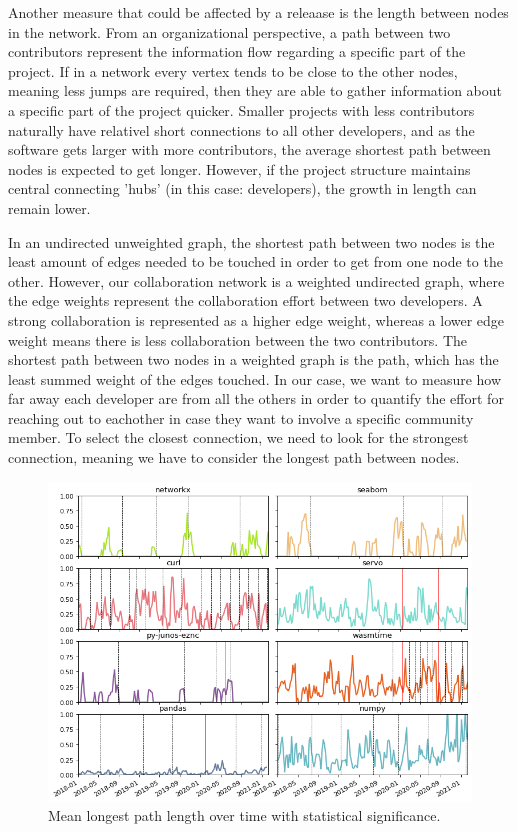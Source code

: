 Another measure that could be affected by a releaase is the length between nodes in the network. From an organizational perspective, a path between two contributors represent the information flow regarding a specific part of the project. If in a network every vertex tends to be close to the other nodes, meaning less jumps are required, then they are able to gather information about a specific part of the project quicker. Smaller projects with less contributors naturally have relativel short connections to all other developers, and as the software gets larger with more contributors, the average shortest path between nodes is expected to get longer. However, if the project structure maintains central connecting 'hubs' (in this case: developers), the growth in length can remain lower.

In an undirected unweighted graph, the shortest path between two nodes is the least amount of edges needed to be touched in order to get from one node to the other. However, our collaboration network is a weighted undirected graph, where the edge weights represent the collaboration effort between two developers. A strong collaboration is represented as a higher edge weight, whereas a lower edge weight means there is less collaboration between the two contributors. The shortest path between two nodes in a weighted graph is the path, which has the least summed weight of the edges touched. In our case, we want to measure how far away each developer are from all the others in order to quantify the effort for reaching out to eachother in case they want to involve a specific community member. To select the closest connection, we need to look for the strongest connection, meaning we have to consider the longest path between nodes.

\begin{figure}
    \centering
    \includegraphics[width=\textwidth]{figures/qualitative/mean_path_length/longest_path_length_all.png}
    \caption{Mean longest path length over time with statistical significance.}
    \label{fig:mean_path}
\end{figure}

